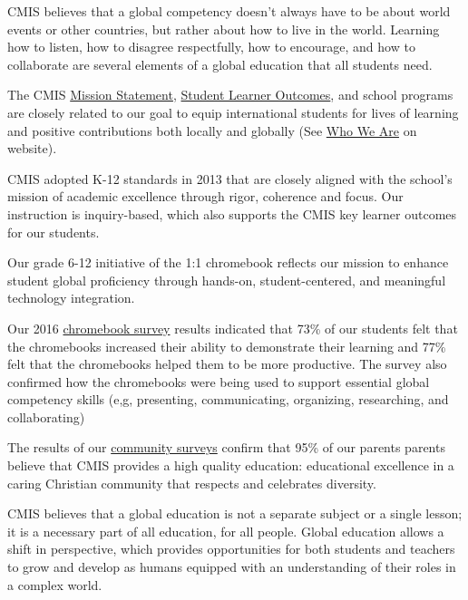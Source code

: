 \begin{findings}
CMIS believes that a global competency doesn't always have to be about world events or other countries, but rather about how to live in the world. Learning how to listen, how to disagree respectfully, how to encourage, and how to collaborate are several elements of a global education that all students need.

The CMIS \href{http://cmis.ac.th/about/vision}{Mission Statement}, \href{http://cmis.ac.th/about/vision}{Student Learner Outcomes}, and school programs are closely related to our goal to equip international students for lives of learning and positive contributions both locally and globally (See \href{http://cmis.ac.th/about/vision}{Who We Are} on website).

CMIS adopted K-12 standards in 2013 that are closely aligned with the school’s mission of academic excellence through rigor, coherence and focus. Our instruction is inquiry-based, which also supports the CMIS key learner outcomes for our students. 

Our grade 6-12 initiative of the 1:1 chromebook reflects our mission to enhance student global proficiency through hands-on, student-centered, and meaningful technology integration. 

Our 2016 \href{https://docs.google.com/a/cmis.ac.th/presentation/d/1xmLAJD96klLrjiBPwCoOMoKmbclYqpIMWaifytzFMgk/edit?usp=sharing}{chromebook survey} results indicated that 73\% of our students felt that the chromebooks increased their ability to demonstrate their learning and 77\% felt that the chromebooks helped them to be more productive. The survey also confirmed how the chromebooks were being used to support essential global competency skills (e,g, presenting, communicating, organizing, researching, and collaborating)

The results of our \href{https://drive.google.com/a/cmis.ac.th/file/d/0B71_pYxcTLo-RlZxQzQyc0NqUFU/view?usp=sharing}{community surveys} confirm that 95\% of our parents parents believe that CMIS provides a high quality education: educational excellence in a caring Christian community that respects and celebrates diversity.

CMIS believes that a global education is not a separate subject or a single lesson; it is a necessary part of all education, for all people. Global education allows a shift in perspective, which provides opportunities for both students and teachers to grow and develop as humans equipped with an understanding of their roles in a complex world.


\end{findings}
